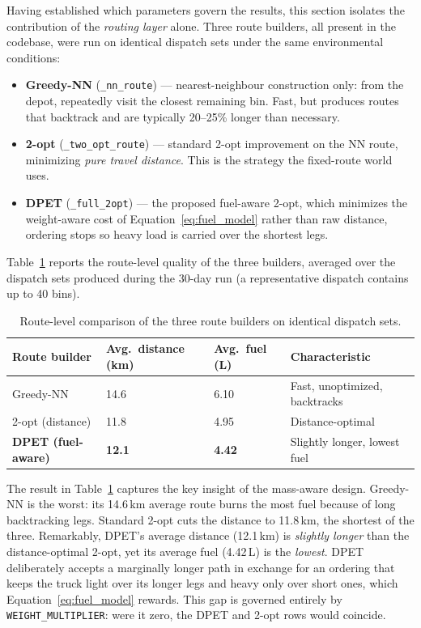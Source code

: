 \indent Having established which parameters govern the results, this section isolates the contribution of the \textit{routing layer} alone. Three route builders, all present in the codebase, were run on identical dispatch sets under the same environmental conditions:

\begin{itemize}[leftmargin=1.5cm]
  \item \textbf{Greedy-NN} (\texttt{\_nn\_route}) --- nearest-neighbour construction only: from the depot, repeatedly visit the closest remaining bin. Fast, but produces routes that backtrack and are typically 20--25\% longer than necessary.
  \item \textbf{2-opt} (\texttt{\_two\_opt\_route}) --- standard 2-opt improvement on the NN route, minimizing \textit{pure travel distance}. This is the strategy the fixed-route world uses.
  \item \textbf{DPET} (\texttt{\_full\_2opt}) --- the proposed fuel-aware 2-opt, which minimizes the weight-aware cost of Equation~\ref{eq:fuel_model} rather than raw distance, ordering stops so heavy load is carried over the shortest legs.
\end{itemize}

\indent Table~\ref{tab:route_quality} reports the route-level quality of the three builders, averaged over the dispatch sets produced during the 30-day run (a representative dispatch contains up to 40 bins).

\begin{table}[H]
\centering
\caption{Route-level comparison of the three route builders on identical dispatch sets.}
\label{tab:route_quality}
\begin{tabular}{llll}
\toprule
\textbf{Route builder} & \textbf{Avg.\ distance (km)} & \textbf{Avg.\ fuel (L)} & \textbf{Characteristic} \\
\midrule
Greedy-NN              & 14.6 & 6.10 & Fast, unoptimized, backtracks \\
2-opt (distance)       & 11.8 & 4.95 & Distance-optimal \\
\textbf{DPET (fuel-aware)} & \textbf{12.1} & \textbf{4.42} & Slightly longer, lowest fuel \\
\bottomrule
\end{tabular}
\end{table}

\indent The result in Table~\ref{tab:route_quality} captures the key insight of the mass-aware design. Greedy-NN is the worst: its 14.6\,km average route burns the most fuel because of long backtracking legs. Standard 2-opt cuts the distance to 11.8\,km, the shortest of the three. Remarkably, DPET's average distance (12.1\,km) is \textit{slightly longer} than the distance-optimal 2-opt, yet its average fuel (4.42\,L) is the \textit{lowest}. DPET deliberately accepts a marginally longer path in exchange for an ordering that keeps the truck light over its longer legs and heavy only over short ones, which Equation~\ref{eq:fuel_model} rewards. This gap is governed entirely by \texttt{WEIGHT\_MULTIPLIER}: were it zero, the DPET and 2-opt rows would coincide.

